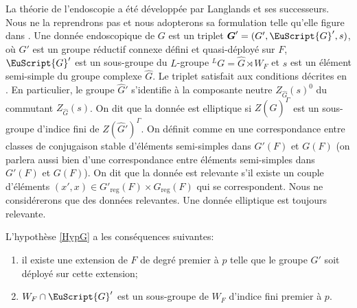 \documentclass[JEP,XML,SOM,Unicode,francais]{cedram}
\let\mathcal \EuScript
\newcommand{\reg}{\mathrm{reg}}
\newcommand{\bG}{\boldsymbol{G}}
\newcommand{\cG}{\mathcal{G}}
\theoremstyle{plain}
\theoremstyle{definition}
\begin{document}
La théorie de l'endoscopie a été développée par Langlands et ses successeurs. Nous ne la reprendrons pas et nous adopterons sa formulation telle qu'elle figure dans \cite{MW}. Une donnée endoscopique de $G$ est un triplet $\bG'=(G',\cG',s)$, où $G'$ est un groupe réductif connexe défini et quasi-déployé sur $F$, $\cG'$ est un sous-groupe du $L$-groupe $^LG=\hat{G}\rtimes W_{F}$ et $s$ est un élément semi-simple du groupe complexe $\hat{G}$. Le triplet satisfait aux conditions décrites en \cite[I.1.5]{MW}. En particulier, le groupe $\hat{G}'$ s'identifie à la composante neutre $Z_{\hat{G}}(s)^0$ du commutant $Z_{\hat{G}}(s)$. On dit que la donnée est elliptique si $Z(\hat{G})^{\Gamma}$ est un sous-groupe d'indice fini de $Z(\hat{G}')^{\Gamma}$. On définit comme en \cite[I.1.10]{MW} une correspondance entre classes de conjugaison stable d'éléments semi-simples dans $G'(F)$ et $G(F)$ (on parlera aussi bien d'une correspondance entre éléments semi-simples dans $G'(F)$ et $G(F)$). On dit que la donnée est relevante s'il existe un couple d'éléments $(x',x)\in G'_{\reg}(F)\times G_{\reg}(F)$ qui se correspondent. Nous ne considérerons que des données relevantes. Une donnée elliptique est toujours relevante.

L'hypothèse \ref{HypG} a les conséquences suivantes:
\begin{enumerate}
\item\label{donneesendoscopiques1}
il existe une extension de $F$ de degré premier à $p$ telle que le groupe $G'$ soit déployé sur cette extension;

\item\label{donneesendoscopiques2}
$W_{F}\cap \cG'$ est un sous-groupe de $W_{F}$ d'indice fini premier à $p$.
\end{enumerate}
\end{document}
